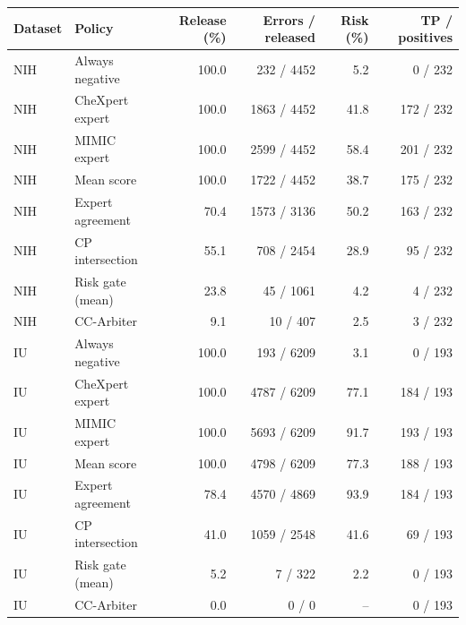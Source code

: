 \begin{tabular}{llrrrr}
\toprule
Dataset & Policy & Release (\%) & Errors / released & Risk (\%) & TP / positives\\
\midrule
NIH & Always negative & 100.0 & 232 / 4452 & 5.2 & 0 / 232\\
NIH & CheXpert expert & 100.0 & 1863 / 4452 & 41.8 & 172 / 232\\
NIH & MIMIC expert & 100.0 & 2599 / 4452 & 58.4 & 201 / 232\\
NIH & Mean score & 100.0 & 1722 / 4452 & 38.7 & 175 / 232\\
NIH & Expert agreement & 70.4 & 1573 / 3136 & 50.2 & 163 / 232\\
NIH & CP intersection & 55.1 & 708 / 2454 & 28.9 & 95 / 232\\
NIH & Risk gate (mean) & 23.8 & 45 / 1061 & 4.2 & 4 / 232\\
NIH & CC-Arbiter & 9.1 & 10 / 407 & 2.5 & 3 / 232\\
\midrule
IU & Always negative & 100.0 & 193 / 6209 & 3.1 & 0 / 193\\
IU & CheXpert expert & 100.0 & 4787 / 6209 & 77.1 & 184 / 193\\
IU & MIMIC expert & 100.0 & 5693 / 6209 & 91.7 & 193 / 193\\
IU & Mean score & 100.0 & 4798 / 6209 & 77.3 & 188 / 193\\
IU & Expert agreement & 78.4 & 4570 / 4869 & 93.9 & 184 / 193\\
IU & CP intersection & 41.0 & 1059 / 2548 & 41.6 & 69 / 193\\
IU & Risk gate (mean) & 5.2 & 7 / 322 & 2.2 & 0 / 193\\
IU & CC-Arbiter & 0.0 & 0 / 0 & -- & 0 / 193\\
\bottomrule
\end{tabular}